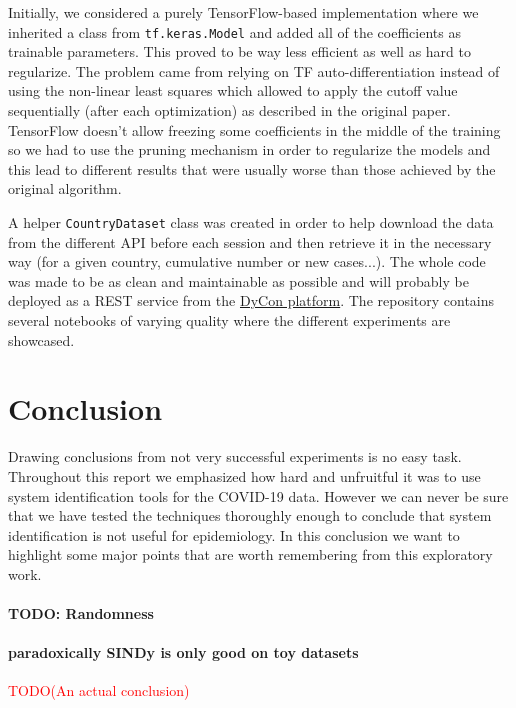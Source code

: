 \documentclass[12pt, letterpaper]{article}
\newcommand{\com}[1]{{\small {\fontfamily{ptm} \selectfont \textcolor{red}{#1}}}}
\begin{document}
Initially, we considered a purely TensorFlow-based implementation where we inherited a class from \texttt{tf.keras.Model} and added all of the coefficients as trainable parameters. 
This proved to be way less efficient as well as hard to regularize. 
The problem came from relying on TF auto-differentiation instead of using the non-linear least squares which allowed to apply the cutoff value sequentially (after each optimization) as described in the original paper. 
TensorFlow doesn't allow freezing some coefficients in the middle of the training so we had to use the pruning mechanism in order to regularize the models and this lead to different results that were usually worse than those achieved by the original algorithm.

A helper \texttt{CountryDataset} class was created in order to help download the data from the different API before each session and then retrieve it in the necessary way (for a given country, cumulative number or new cases...). 
The whole code was made to be as clean and maintainable as possible and will probably be deployed as a REST service from the \href{https://deustotech.github.io/DyCon-Blog/}{DyCon platform}.
The repository contains several notebooks of varying quality where the different experiments are showcased. 


\section{Conclusion}\label{sec:conclusion}

Drawing conclusions from not very successful experiments is no easy task.
Throughout this report we emphasized how hard and unfruitful it was to use system identification tools for the COVID-19 data.
However we can never be sure that we have tested the techniques thoroughly enough to conclude that system identification is not useful for epidemiology.
In this conclusion we want to highlight some major points that are worth remembering from this exploratory work.

\paragraph{TODO: Randomness}
\paragraph{paradoxically SINDy is only good on toy datasets}

\com{TODO(An actual conclusion)}
\end{document}

